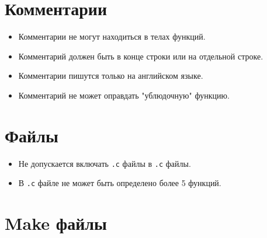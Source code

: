 \documentclass{42-ru}
\begin{document}
    \section{Комментарии}

        \begin{itemize}

            \item Комментарии не могут находиться в телах функций.

            \item Комментарий должен быть в конце строки или на отдельной строке.

            \item Комментарии пишутся только на английском языке.

            \item Комментарий не может оправдать "ублюдочную" функцию.

        \end{itemize}

    \newpage


    \section{Файлы}

        \begin{itemize}

            \item Не допускается включать \texttt{.c} файлы в \texttt{.c} файлы.

            \item В \texttt{.c} файле не может быть определено более 5 функций.

        \end{itemize}

    \newpage


    \section{Make файлы}
\end{document}

